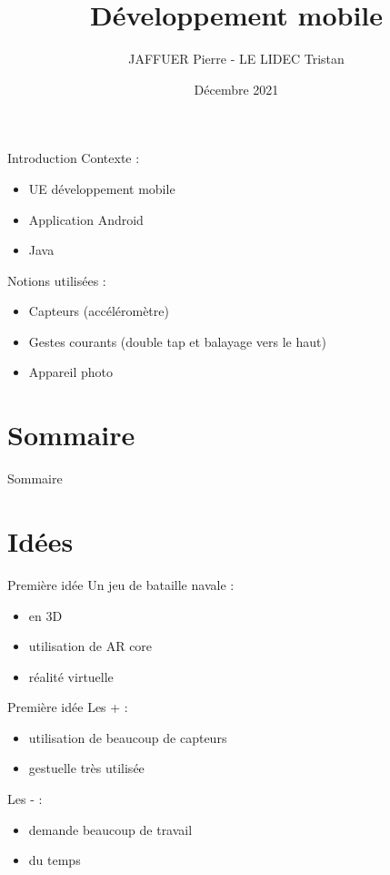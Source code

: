 \documentclass[t,12pt]{beamer}
\title{Développement mobile}
\author{JAFFUER Pierre - LE LIDEC Tristan}
\date{Décembre 2021}
\begin{document}
\frame{\titlepage}


\begin{frame}{Introduction}
    Contexte : 
    \begin{itemize}
        \item UE développement mobile
        \item Application Android
        \item Java
    \end{itemize}
    
    Notions utilisées :
    \begin{itemize}
        \item Capteurs (accéléromètre)
        \item Gestes courants  (double tap et balayage vers le haut)
        \item Appareil photo
    \end{itemize}
\end{frame}

\section*{Sommaire}
\begin{frame}{Sommaire}
\tableofcontents
\end{frame}



\section{Idées}
\begin{frame}{Première idée}
    Un jeu de bataille navale :
    \begin{itemize}
        \item en 3D
        \item utilisation de AR core
        \item réalité virtuelle
    \end{itemize}
\end{frame}

\begin{frame}{Première idée}
    Les + :
    \begin{itemize}
        \item utilisation de beaucoup de capteurs
        \item gestuelle très utilisée
    \end{itemize}
    Les - :
    \begin{itemize}
        \item demande beaucoup de travail
        \item du temps
    \end{itemize}
\end{frame}
\end{document}
